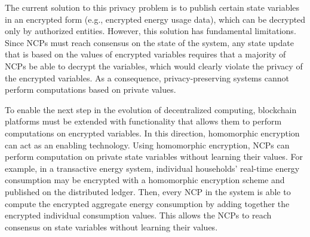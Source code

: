 \documentclass[12pt,letterpaper]{article}
\begin{document}
The current solution to this privacy problem is to publish certain state variables in an encrypted form (e.g., encrypted energy usage data), which can be decrypted only by authorized entities.
However, this solution has fundamental limitations.
Since NCPs must reach consensus on the state of the system, any state update that is based on the values of encrypted variables requires that a majority of NCPs be able to decrypt the variables, which would clearly violate the privacy of the encrypted variables.
As a consequence, privacy-preserving systems cannot perform computations based on private values.

To enable the next step in the evolution of decentralized computing, blockchain platforms must be extended with functionality that allows them to perform computations on encrypted variables.
In this direction, homomorphic encryption can act as an enabling technology.
Using homomorphic encryption, NCPs can perform computation on private state variables without learning their values.
For example, in a transactive energy system, individual households' real-time energy consumption may be encrypted with a homomorphic encryption scheme and published on the distributed ledger.
Then, every NCP in the system is able to compute the encrypted aggregate energy consumption by adding together the encrypted individual consumption values.
This allows the NCPs to reach consensus on state variables without learning their values.


\clearpage


\end{document}
